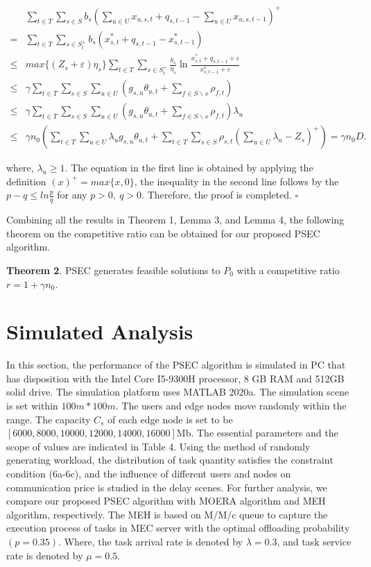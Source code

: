 \documentclass[journal,article,submit,pdftex,moreauthors]{Definitions/mdpi}
\begin{document}
\begin{align*}
&\sum_{t\in T}\sum_{s\in S}b_s(\sum_{u\in U}x_{u,s,t}+q_{s,t-1}-\sum_{u\in U}x_{u,s,t-1})^{+}\\
= & \sum_{t\in T}\sum_{s\in S_t^{+}} b_s (x_{s,t}^{*}+q_{s,t-1}- x_{s,t-1}^{*}) \\
\le & max\{(Z_s+\varepsilon)\eta_s\}\sum_{t\in T}\sum_{s\in S_t^{+}} \frac{b_s}{\eta_s}\ln \frac{ x_{s,t}^{*}+q_{s,t-1}+\varepsilon }{ x_{s,t-1}^{*}+\varepsilon }\\
\le & \gamma \sum_{t\in T}\sum_{s\in S} \sum_{u\in U} (g_{s,u}\theta_{u,t}+\sum_{f\in S \backslash s}\rho_{f,t}) \\
\le & \gamma \sum_{t\in T}\sum_{s\in S} \sum_{u\in U} (g_{s,u}\theta_{u,t}+\sum_{f\in S \backslash s}\rho_{f,t})\lambda_u \\
\le & \gamma n_0(\sum_{t\in T} \sum_{u\in U}\lambda_u g_{s,u}\theta_{u,t}+\sum_{t\in T}\sum_{s\in S}\rho_{s,t}(\sum_{u\in U}\lambda_u-Z_s)^{+}) =\gamma n_0 D.
\end{align*}

where, $\lambda_u\ge 1$. The equation in the first line is obtained by applying the definition $(x)^+=max\{x,0\}$, the inequality in the second line follows by the $p-q\leq ln\frac{p}{q}$ for any $p>0,~q>0$. Therefore, the
proof is completed. $\square$

Combining all the results in Theorem 1, Lemma 3, and Lemma 4, the following theorem on the competitive ratio can be obtained for our proposed PSEC algorithm.


\textbf{Theorem 2}.  PSEC generates feasible solutions to $P_0$ with a competitive ratio $r=1+\gamma n_0$.

\section{Simulated Analysis}
In this section, the performance of the  PSEC algorithm is simulated in PC that has
disposition with the Intel Core I5-9300H processor, 8 GB RAM and 512GB solid drive. The simulation platform uses MATLAB 2020a. The simulation scene is set within $100m*100m$. The users and  edge nodes move randomly within the range.  The capacity $C_s$ of each edge node is set to be $[6000,8000,10000,12000,14000,16000]$Mb.  The essential parameters and
the scope of values are indicated in Table 4. Using the method of randomly generating workload, the distribution of task quantity satisfies the constraint condition (6a-6c), and the influence of different users and nodes on communication price is studied in the delay scenes. For further analysis, we compare our proposed PSEC algorithm with MOERA \cite{WANG} algorithm and MEH\cite{LiW21} algorithm, respectively. The MEH  is based on M/M/c queue to capture the execution process of tasks in MEC server with the optimal offloading probability $(p =0.35)$. Where, the task arrival rate is denoted by $\lambda=0.3$, and task service rate is denoted by $\mu=0.5$. 
\end{document}
